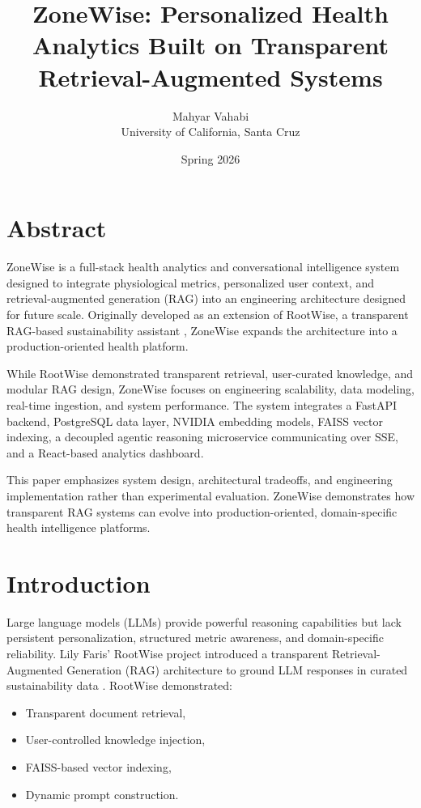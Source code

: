 \documentclass[11pt,twocolumn]{article}
\title{ZoneWise: Personalized Health Analytics Built on Transparent Retrieval-Augmented Systems}
\author{Mahyar Vahabi \\ University of California, Santa Cruz}
\date{Spring 2026}
\begin{document}
\maketitle

\section{Abstract}
ZoneWise is a full-stack health analytics and conversational intelligence system designed to integrate physiological metrics, personalized user context, and retrieval-augmented generation (RAG) into an engineering architecture designed for future scale. Originally developed as an extension of RootWise, a transparent RAG-based sustainability assistant \cite{faris2025rootwise}, ZoneWise expands the architecture into a production-oriented health platform. 

While RootWise demonstrated transparent retrieval, user-curated knowledge, and modular RAG design, ZoneWise focuses on engineering scalability, data modeling, real-time ingestion, and system performance. The system integrates a FastAPI backend, PostgreSQL data layer, NVIDIA embedding models, FAISS vector indexing, a decoupled agentic reasoning microservice communicating over SSE, and a React-based analytics dashboard. 

This paper emphasizes system design, architectural tradeoffs, and engineering implementation rather than experimental evaluation. ZoneWise demonstrates how transparent RAG systems can evolve into production-oriented, domain-specific health intelligence platforms.

\section{Introduction}

Large language models (LLMs) provide powerful reasoning capabilities but lack persistent personalization, structured metric awareness, and domain-specific reliability. Lily Faris’ RootWise project introduced a transparent Retrieval-Augmented Generation (RAG) architecture to ground LLM responses in curated sustainability data \cite{faris2025rootwise}. RootWise demonstrated:

\begin{itemize}
    \item Transparent document retrieval,
    \item User-controlled knowledge injection,
    \item FAISS-based vector indexing,
    \item Dynamic prompt construction.
\end{itemize}
\end{document}
